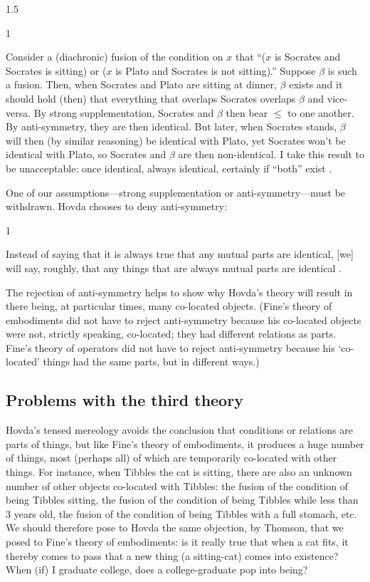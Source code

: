 \documentclass[11pt]{article}
\newenvironment{squote}{%
\begin{spacing}{1}
\begin{list}{}{%
\setlength{\labelwidth}{0pt}%
\rightmargin\leftmargin%
}
\item\relax
}{%
\end{list}%
\end{spacing}
}
\begin{document}
\begin{spacing}{1.5}
\begin{squote}
Consider a (diachronic) fusion of the condition on $x$ that ``($x$ is
Socrates and Socrates is sitting) or ($x$ is Plato and Socrates is not
sitting).''  Suppose $\beta$ is such a fusion.  Then, when Socrates
and Plato are sitting at dinner, $\beta$ exists and it should hold
(then) that everything that overlaps Socrates overlaps $\beta$ and
vice-versa.  By strong supplementation, Socrates and $\beta$ then bear
$\leq$ to one another.  By anti-symmetry, they are then identical.
But later, when Socrates stands, $\beta$ will then (by similar
reasoning) be identical with Plato, yet Socrates won’t be identical
with Plato, so Socrates and $\beta$ are then non-identical.  I take
this result to be unacceptable: once identical, always identical,
certainly if ``both'' exist \citeyearpar[17]{hovda2011}.
\end{squote}

One of our assumptions---strong supplementation or
anti-symmetry---must be withdrawn.  Hovda chooses to deny
anti-symmetry:

\begin{squote}
Instead of saying that it is always true that any mutual parts are
identical, [we] will say, roughly, that any things that are always
mutual parts are identical \citep[17]{hovda2011}.
\end{squote}

The rejection of anti-symmetry helps to show why Hovda's theory will
result in there being, at particular times, many co-located objects.
(Fine's theory of embodiments did not have to reject anti-symmetry
because his co-located objects were not, strictly speaking,
co-located; they had different relations as parts.  Fine's theory of
operators did not have to reject anti-symmetry because his
`co-located' things had the same parts, but in different ways.)

\subsection{Problems with the third theory}
\label{problems3}
Hovda's tensed mereology avoids the conclusion that conditions or
relations are parts of things, but like Fine's theory of embodiments,
it produces a huge number of things, most (perhaps all) of which are
temporarily co-located with other things.  For instance, when Tibbles
the cat is sitting, there are also an unknown number of other objects
co-located with Tibbles: the fusion of the condition of being Tibbles
sitting, the fusion of the condition of being Tibbles while less than
3 years old, the fusion of the condition of being Tibbles with a full
stomach, etc.  We should therefore pose to Hovda the same objection,
by Thomson, that we posed to Fine's theory of embodiments: is it
really true that when a cat fits, it thereby comes to pass that a new
thing (a sitting-cat) comes into existence?  When (if) I graduate
college, does a college-graduate pop into being?


\end{spacing}
\end{document}

